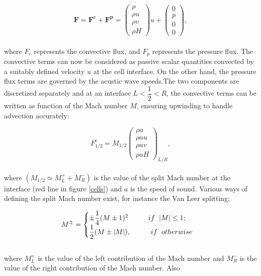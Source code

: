 \documentclass[a5paper]{sapthesis}
\begin{document}
	\begin{equation}	
		\mathbf{F} = \mathbf{F^c} + \mathbf{F^p} = 
		\begin{pmatrix}
			\rho    \\	
			\rho u  \\
			\rho v  \\
			\rho H
		\end{pmatrix} u
		+
		\begin{pmatrix}
			0 \\
			p \\
			0 \\
			0
		\end{pmatrix},
	\end{equation}
	\\
	where $F_c$ represents the convective flux, and $F_p$ represents the pressure flux. The convective terms can now be considered as passive scalar quantities convected by a suitably defined velocity $u$ at the cell interface. On the other hand, the pressure flux terms are governed by the acustic wave speeds.The two components are discretized separately and at an interface $L<\dfrac{1}{2}<R$, the convective terms can be written as function of the Mach number $M$, ensuring upwinding to handle advection accurately:
	
	\begin{equation}
		F_{1/2}^c = M_{1/2}
		\begin{pmatrix}
			\rho a 	 \\
			\rho au  \\
			\rho av  \\
			\rho aH
		\end{pmatrix}_{L/R},
	\end{equation}
	\\
	where $(M_{1/2} \simeq M_L^+ +M_R^-)$ is the value of the split Mach number at the interface (red line in figure \ref{cells}) and $a$ is the speed of sound. Various ways of defining the split Mach number exist, for instance the Van Leer\citep{van1982} splitting:
	
	\begin{equation}
		M^{\pm} = 
		\begin{cases}
			\pm\dfrac{1}{4}(M \pm 1)^2  \hspace{10 mm} if \hspace{2 mm} |M| \leq 1;\\
			\dfrac{1}{2} (M \pm |M| ),  \hspace{10 mm} if \hspace{2 mm} otherwise
		\end{cases}
	\end{equation}	
	\\
	where $M_L^+$ is the value of the left contribution of the Mach number and $M_R^-$ is the value of the right contribution of the Mach number. Also 
	
\end{document}
